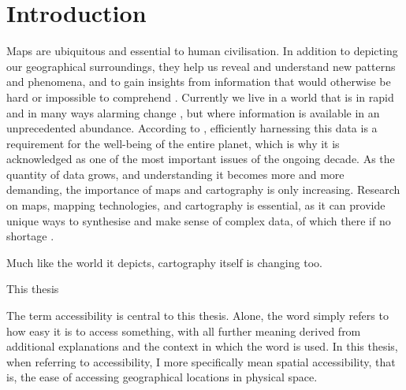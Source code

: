 \section{Introduction}



Maps are ubiquitous and essential to human civilisation.
In addition to depicting our geographical surroundings,
they help us reveal and understand new patterns and phenomena,
and to gain insights from information
that would otherwise be hard or impossible to comprehend \parencite{mac2004}.
Currently we live in a world that is in rapid
and in many ways alarming change \parencite{un2023},
but where information is available in an unprecedented abundance.
According to \textcite{un2020}, efficiently harnessing this data
is a requirement for the well-being of the entire planet,
which is why it is acknowledged as
one of the most important issues of the ongoing decade.
As the quantity of data grows,
and understanding it becomes more and more demanding,
the importance of maps and cartography is only increasing.
Research on maps, mapping technologies, and cartography is essential,
as it can provide unique ways to synthesise and make sense of complex data,
of which there if no shortage \parencite{kra2021}.

Much like the world it depicts, cartography itself is changing too.


This thesis 


The term accessibility is central to this thesis.
Alone, the word simply refers to how easy it is to access something,
with all further meaning derived from
additional explanations and the context in which the word is used.
In this thesis, when referring to accessibility,
I more specifically mean spatial accessibility,
that is, the ease of accessing geographical locations in physical space.


